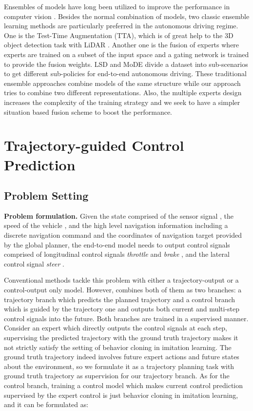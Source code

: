 \documentclass{article}
\begin{document}
Ensembles of models have long been utilized to improve the performance in computer vision \citep{dietterich2000ensemble, krahenbuhl2015lpo, lakshminarayanan2017deepensemble, vyas2018oodensemble, xu2020mmensemble, prakash2020darb}.
Besides the normal combination of models, two classic ensemble learning methods are particularly preferred in the autonomous driving regime. One is the Test-Time Augmentation (TTA), which is of great help to the 3D object detection task with LiDAR \citep{carranza2021odadensemble, li2022deepfusion}.
Another one is the fusion of experts \citep{jacobs1991expertmixture} where experts are trained on a subset of the input space and a gating network is trained to provide the fusion weights. LSD \citep{ohn2020lsd} and MoDE \citep{kim2022mode} divide a dataset into sub-scenarios to get different sub-policies for end-to-end autonomous driving.
These traditional ensemble approaches combine models of the same structure while our approach tries to combine two different representations.
Also, the multiple experts design increases the complexity of the training strategy and we seek to have a simpler situation based fusion scheme to boost the performance.




\section{Trajectory-guided Control Prediction} \label{sec:method}
\subsection{Problem Setting} \label{sec:prob_set}



\textbf{Problem formulation.} Given the state  comprised of the sensor signal , the speed of the vehicle , and the high level navigation information  including a discrete navigation command and the coordinates of navigation target provided by the global planner, the end-to-end model needs to output control signals  comprised of longitudinal control signals \textit{throttle}  and \textit{brake} , and the lateral control signal \textit{steer} .


Conventional methods tackle this problem with either a trajectory-output or a control-output only model. However, \algname combines both of them as two branches: a trajectory branch which predicts the planned trajectory and a control branch which is guided by the trajectory one and outputs both current and multi-step control signals into the future. Both branches are trained in a supervised manner.
Consider an expert which directly outputs the control signals at each step, supervising the predicted trajectory with the ground truth trajectory makes it not strictly satisfy the setting of behavior cloning in imitation learning. The ground truth trajectory indeed involves future expert actions and future states about the environment, so we formulate it as a trajectory planning task with ground truth trajectory as supervision for our trajectory branch. As for the control branch, training a control model which 
makes current control prediction supervised by the expert control is just behavior cloning in imitation learning, and it can be formulated as:
\end{document}
